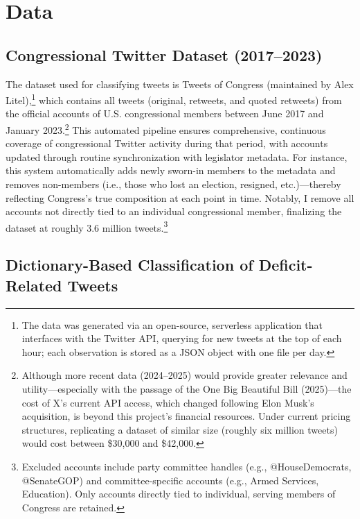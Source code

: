 \documentclass[
  12pt,
]{article}
\begin{document}
\section{Data}\label{data}

\subsection{Congressional Twitter Dataset
(2017--2023)}\label{congressional-twitter-dataset-20172023}

The dataset used for classifying tweets is Tweets of Congress
(maintained by Alex Litel),\footnote{The data was generated via an
  open-source, serverless application that interfaces with the Twitter
  API, querying for new tweets at the top of each hour; each observation
  is stored as a JSON object with one file per day.} which contains all
tweets (original, retweets, and quoted retweets) from the official
accounts of U.S. congressional members between June 2017 and January
2023.\footnote{Although more recent data (2024--2025) would provide
  greater relevance and utility---especially with the passage of the One
  Big Beautiful Bill (2025)---the cost of X's current API access, which
  changed following Elon Musk's acquisition, is beyond this project's
  financial resources. Under current pricing structures, replicating a
  dataset of similar size (roughly six million tweets) would cost
  between \$30,000 and \$42,000.} This automated pipeline ensures
comprehensive, continuous coverage of congressional Twitter activity
during that period, with accounts updated through routine
synchronization with legislator metadata. For instance, this system
automatically adds newly sworn-in members to the metadata and removes
non-members (i.e., those who lost an election, resigned, etc.)---thereby
reflecting Congress's true composition at each point in time. Notably, I
remove all accounts not directly tied to an individual congressional
member, finalizing the dataset at roughly 3.6 million tweets.\footnote{Excluded
  accounts include party committee handles (e.g., @HouseDemocrats,
  @SenateGOP) and committee-specific accounts (e.g., Armed Services,
  Education). Only accounts directly tied to individual, serving members
  of Congress are retained.}

\subsection{Dictionary-Based Classification of Deficit-Related
Tweets}\label{dictionary-based-classification-of-deficit-related-tweets}
\end{document}
